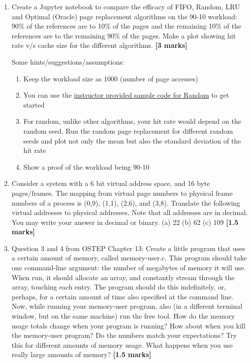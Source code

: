 \documentclass[]{article}
\begin{document}
\begin{enumerate}
	\item Create a Jupyter notebook to compare the efficacy of FIFO, Random, LRU and Optimal (Oracle) page replacement algorithms on the 90-10 workload: 90\% of the references are to 10\% of the pages and the remaining 10\% of the references are to the remaining 90\% of the pages. Make a plot showing hit rate v/s cache size for the different algorithms. \textbf{[3 marks]}
	
	Some hints/suggestions/assumptions:
	\begin{enumerate}
		\item Keep the workload size as 1000 (number of page accesses)
		\item You can use the
		 \href{https://github.com/nipunbatra/nipunbatra.github.io/blob/master/teaching/os-fall-18/code/replacement-random-plot.py}{instructor provided sample code for Random} to get started
	\item For random, unlike other algorithms, your hit rate would depend on the random seed. Run the random page replacement for different random seeds and plot not only the mean but also the standard deviation of the hit rate
	\item Show a proof of the workload being 90-10
	\end{enumerate}
	
	
	\item Consider a system with a 6 bit virtual address space, and 16 byte pages/frames. The mapping
	from virtual page numbers to physical frame numbers of a process is (0,9), (1,1), (2,6), and
	(3,8). Translate the following virtual addresses to physical addresses. Note that all addresses
	are in decimal. You may write your answer in decimal or binary.  
	(a) 22
	(b) 62
	(c) 109 \textbf{[1.5 marks]}
	
	\item Question 3 and 4 from OSTEP Chapter 13: Create a little program that uses a certain amount of memory, called
	memory-user.c. This program should take one command-line argument:
	the number of megabytes of memory it will use. When run, it should allocate
	an array, and constantly stream through the array, touching each entry.
	The program should do this indefinitely, or, perhaps, for a certain amount
	of time also specified at the command line.
	Now, while running your memory-user program, also (in a different terminal
	window, but on the same machine) run the free tool. How do the
	memory usage totals change when your program is running? How about
	when you kill the memory-user program? Do the numbers match your expectations?
	Try this for different amounts of memory usage. What happens
	when you use really large amounts of memory?  \textbf{[1.5 marks]}
	
\end{enumerate}
\end{document}
